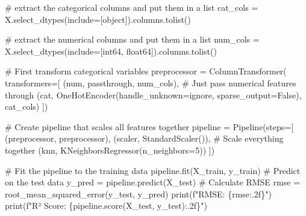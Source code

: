 \documentclass[
  letterpaper,
  DIV=11,
  numbers=noendperiod]{scrreprt}
\newenvironment{Shaded}{\begin{snugshade}}{\end{snugshade}}
\newcommand{\BuiltInTok}[1]{\textcolor[rgb]{0.00,0.23,0.31}{#1}}
\newcommand{\CommentTok}[1]{\textcolor[rgb]{0.37,0.37,0.37}{#1}}
\newcommand{\DecValTok}[1]{\textcolor[rgb]{0.68,0.00,0.00}{#1}}
\newcommand{\NormalTok}[1]{\textcolor[rgb]{0.00,0.23,0.31}{#1}}
\newcommand{\OperatorTok}[1]{\textcolor[rgb]{0.37,0.37,0.37}{#1}}
\newcommand{\SpecialCharTok}[1]{\textcolor[rgb]{0.37,0.37,0.37}{#1}}
\newcommand{\SpecialStringTok}[1]{\textcolor[rgb]{0.13,0.47,0.30}{#1}}
\newcommand{\StringTok}[1]{\textcolor[rgb]{0.13,0.47,0.30}{#1}}
\newcommand{\VariableTok}[1]{\textcolor[rgb]{0.07,0.07,0.07}{#1}}
\begin{document}
\begin{Shaded}
\begin{Highlighting}[]
\CommentTok{\# extract the categorical columns and put them in a list}
\NormalTok{cat\_cols }\OperatorTok{=}\NormalTok{ X.select\_dtypes(include}\OperatorTok{=}\NormalTok{[}\StringTok{\textquotesingle{}object\textquotesingle{}}\NormalTok{]).columns.tolist()}

\CommentTok{\# extract the numerical columns and put them in a list}
\NormalTok{num\_cols }\OperatorTok{=}\NormalTok{ X.select\_dtypes(include}\OperatorTok{=}\NormalTok{[}\StringTok{\textquotesingle{}int64\textquotesingle{}}\NormalTok{, }\StringTok{\textquotesingle{}float64\textquotesingle{}}\NormalTok{]).columns.tolist()}
\end{Highlighting}
\end{Shaded}

\begin{Shaded}
\begin{Highlighting}[]
\CommentTok{\# First transform categorical variables}
\NormalTok{preprocessor }\OperatorTok{=}\NormalTok{ ColumnTransformer(}
\NormalTok{    transformers}\OperatorTok{=}\NormalTok{[}
\NormalTok{        (}\StringTok{\textquotesingle{}num\textquotesingle{}}\NormalTok{, }\StringTok{\textquotesingle{}passthrough\textquotesingle{}}\NormalTok{, num\_cols),  }\CommentTok{\# Just pass numerical features through}
\NormalTok{        (}\StringTok{\textquotesingle{}cat\textquotesingle{}}\NormalTok{, OneHotEncoder(handle\_unknown}\OperatorTok{=}\StringTok{\textquotesingle{}ignore\textquotesingle{}}\NormalTok{, sparse\_output}\OperatorTok{=}\VariableTok{False}\NormalTok{), cat\_cols)}
\NormalTok{    ])}

\CommentTok{\# Create pipeline that scales all features together}
\NormalTok{pipeline }\OperatorTok{=}\NormalTok{ Pipeline(steps}\OperatorTok{=}\NormalTok{[}
\NormalTok{    (}\StringTok{\textquotesingle{}preprocessor\textquotesingle{}}\NormalTok{, preprocessor),}
\NormalTok{    (}\StringTok{\textquotesingle{}scaler\textquotesingle{}}\NormalTok{, StandardScaler()),  }\CommentTok{\# Scale everything together}
\NormalTok{    (}\StringTok{\textquotesingle{}knn\textquotesingle{}}\NormalTok{, KNeighborsRegressor(n\_neighbors}\OperatorTok{=}\DecValTok{5}\NormalTok{))}
\NormalTok{])}

\CommentTok{\# Fit the pipeline to the training data}
\NormalTok{pipeline.fit(X\_train, y\_train)}
\CommentTok{\# Predict on the test data}
\NormalTok{y\_pred }\OperatorTok{=}\NormalTok{ pipeline.predict(X\_test)}
\CommentTok{\# Calculate RMSE}
\NormalTok{rmse }\OperatorTok{=}\NormalTok{ root\_mean\_squared\_error(y\_test, y\_pred)}
\BuiltInTok{print}\NormalTok{(}\SpecialStringTok{f"RMSE: }\SpecialCharTok{\{}\NormalTok{rmse}\SpecialCharTok{:.2f\}}\SpecialStringTok{"}\NormalTok{)}
\BuiltInTok{print}\NormalTok{(}\SpecialStringTok{f"R² Score: }\SpecialCharTok{\{}\NormalTok{pipeline}\SpecialCharTok{.}\NormalTok{score(X\_test, y\_test)}\SpecialCharTok{:.2f\}}\SpecialStringTok{"}\NormalTok{)}
\end{Highlighting}
\end{Shaded}
\end{document}
